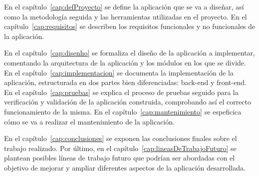 En el capítulo~\ref{cap:defProyecto} se define la aplicación que se va a diseñar, así como la metodología seguida y las herramientas utilizadas en el proyecto.
En el capítulo~\ref{cap:requisitos} se describen los requisitos funcionales y no funcionales de la aplicación.

En el capítulo~\ref{cap:disenho} se formaliza el diseño de la aplicación a implementar, comentando la arquitectura de la aplicación y los módulos en los que se divide.
En el capítulo~\ref{cap:implementacion} se documenta la implementación de la aplicación, estructurada en dos partes bien diferenciadas: \gls{back-end} y \gls{front-end}.
En el capítulo~\ref{cap:pruebas} se explica el proceso de pruebas seguido para la verificación y validación de la aplicación construida, comprobando así el correcto funcionamiento de la misma.
En el capítulo~\ref{cap:mantenimiento} se espeficica cómo se va a realizar el mantenimiento de la aplicación.

En el capítulo~\ref{cap:conclusiones} se exponen las conclusiones finales sobre el trabajo realizado. Por último, en el capítulo~\ref{cap:lineasDeTrabajoFuturo} se plantean posibles líneas de trabajo futuro que podrían ser abordadas con el objetivo de mejorar y ampliar diferentes aspectos de la aplicación desarrollada.